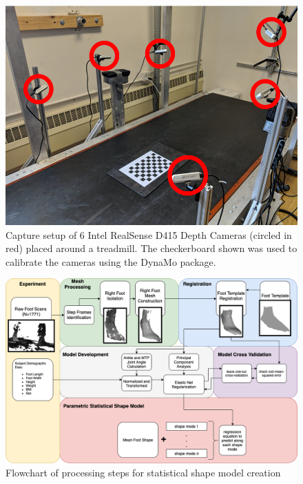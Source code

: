 \documentclass[preprint]{elsarticle}
\begin{document}
\newpage

\begin{figure}
\hypertarget{fig:testSetup}{%
\centering
\includegraphics[width=1\textwidth,height=\textheight]{fig/capturesetup.png}
\caption{Capture setup of 6 Intel RealSense D415 Depth Cameras (circled in red) placed around a treadmill. The checkerboard shown was used to calibrate the cameras using the DynaMo package.}\label{fig:testSetup}
}
\end{figure}

\newpage

\begin{figure}
\hypertarget{fig:dataflow}{%
\centering
\includegraphics[width=1\textwidth,height=\textheight]{fig/footProcessing.png}
\caption{Flowchart of processing steps for statistical shape model creation}\label{fig:dataflow}
}
\end{figure}
\end{document}
